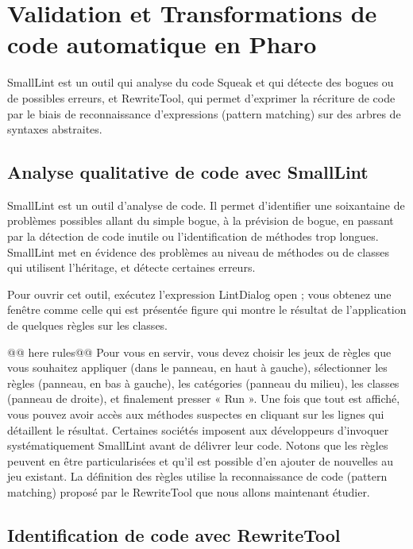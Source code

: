 \documentclass[a4paper,10pt,twoside]{book}
\begin{document}


\chapter{Validation et Transformations de code automatique en Pharo}
SmallLint est un outil qui analyse du code Squeak et qui
d\'etecte des bogues ou de possibles erreurs, et RewriteTool, qui permet
d'exprimer la r\'ecriture de code par le biais de reconnaissance
d'expressions (pattern matching) sur des arbres de syntaxes
abstraites. 

\section{ Analyse qualitative de code avec SmallLint}

 SmallLint est un outil d'analyse de code. Il permet d'identifier une soixantaine de
probl\`emes possibles allant du simple bogue, à la pr\'evision de bogue,
en passant par la d\'etection de code inutile ou l'identification de
m\'ethodes trop longues. SmallLint met en \'evidence des probl\`emes au
niveau de m\'ethodes ou de classes qui utilisent l'h\'eritage, et d\'etecte
certaines erreurs.  

Pour ouvrir cet outil, ex\'ecutez l'expression
LintDialog open ; vous obtenez une fenêtre comme celle qui est
pr\'esent\'ee figure  qui montre le r\'esultat de l'application de
quelques r\`egles sur les classes.


@@ here rules@@
 Pour vous en servir,
vous devez choisir les jeux de r\`egles que vous souhaitez appliquer
(dans le panneau, en haut à gauche), s\'electionner les r\`egles (panneau,
en bas à gauche), les cat\'egories (panneau du milieu), les classes
(panneau de droite), et finalement presser « Run ». Une fois que tout
est affich\'e, vous pouvez avoir acc\`es aux m\'ethodes suspectes en
cliquant sur les lignes qui d\'etaillent le r\'esultat.  Certaines
soci\'et\'es imposent aux d\'eveloppeurs d'invoquer syst\'ematiquement
SmallLint avant de d\'elivrer leur code. Notons que les r\`egles peuvent
en être particularis\'ees et qu'il est possible d'en ajouter de
nouvelles au jeu existant. La d\'efinition des r\`egles utilise la
reconnaissance de code (pattern matching) propos\'e par le RewriteTool
que nous allons maintenant \'etudier.

\section{Identification de code avec RewriteTool}
\end{document}
